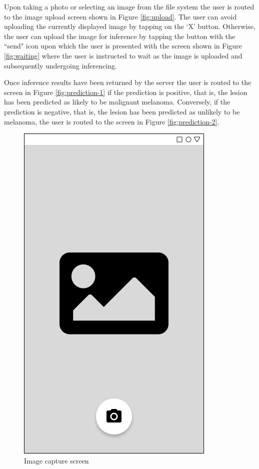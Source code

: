 \documentclass[12pt, a4paper]{article}
\begin{document}
Upon taking a photo or selecting an image from the file system the user is routed to the image upload screen shown in Figure \ref{fig:upload}. The user can avoid uploading the currently displayed image by tapping on the `X' button. Otherwise, the user can upload the image for inference by tapping the button with the ``send" icon upon which the user is presented with the screen shown in Figure \ref{fig:waiting} where the user is instructed to wait as the image is uploaded and subsequently undergoing inferencing.

Once inference results have been returned by the server the user is routed to the screen in Figure \ref{fig:prediction-1} if the prediction is positive, that is, the lesion has been predicted as likely to be malignant melanoma. Conversely, if the prediction is negative, that is, the lesion has been predicted as unlikely to be melanoma, the user is routed to the screen in Figure \ref{fig:prediction-2}.
\begin{figure}[h]
    \centering
    \setlength{\fboxsep}{8pt}
    \includegraphics[scale=0.45, fbox]{CaptureSelect.png}
    \caption{Image capture screen}
    \label{fig:capture-select}
\end{figure}
\end{document}
